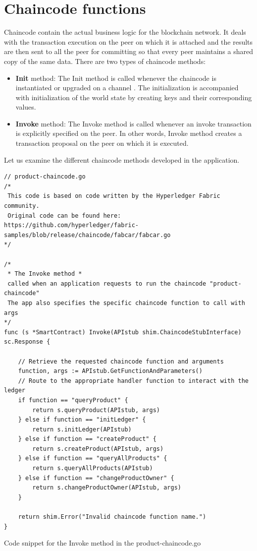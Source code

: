 \documentclass[
  a4paper,  %
  twoside,  %
  bibliography=totoc,
  headsepline,
  cleardoublepage=empty,
  parskip=half,
  draft=false
]{scrbook}
\begin{document}
\section{Chaincode functions}
Chaincode contain the actual business logic for the blockchain network. It deals with the transaction execution on the peer on which it is attached and the results are then sent to all the peer for committing so that every peer maintains a shared copy of the same data. There are two types of chaincode methods:
\begin{itemize}
    \item \textbf{Init} method: The Init method is called whenever the chaincode is instantiated or upgraded on a channel \cite{Chaincode}. The initialization is accompanied with initialization of the world state by creating keys and their corresponding values.
    \item \textbf{Invoke} method: The Invoke method is called whenever an invoke transaction is explicitly specified on the peer. In other words, Invoke method creates a transaction proposal on the peer on which it is executed.
\end{itemize}
Let us examine the different chaincode methods \cite{cm} developed in the application.

\begin{Listing}[b!]
\begin{lstlisting}
// product-chaincode.go
/*
 This code is based on code written by the Hyperledger Fabric community.
 Original code can be found here: https://github.com/hyperledger/fabric-samples/blob/release/chaincode/fabcar/fabcar.go
*/

/*
 * The Invoke method *
 called when an application requests to run the chaincode "product-chaincode"
 The app also specifies the specific chaincode function to call with args
*/
func (s *SmartContract) Invoke(APIstub shim.ChaincodeStubInterface) sc.Response {

	// Retrieve the requested chaincode function and arguments
	function, args := APIstub.GetFunctionAndParameters()
	// Route to the appropriate handler function to interact with the ledger
	if function == "queryProduct" {
		return s.queryProduct(APIstub, args)
	} else if function == "initLedger" {
		return s.initLedger(APIstub)
	} else if function == "createProduct" {
		return s.createProduct(APIstub, args)
	} else if function == "queryAllProducts" {
		return s.queryAllProducts(APIstub)
	} else if function == "changeProductOwner" {
		return s.changeProductOwner(APIstub, args)
	}

	return shim.Error("Invalid chaincode function name.")
}
\end{lstlisting}
\caption{Code snippet for the Invoke method in the product-chaincode.go}
\label{lst:invoke}
\end{Listing}
\end{document}
